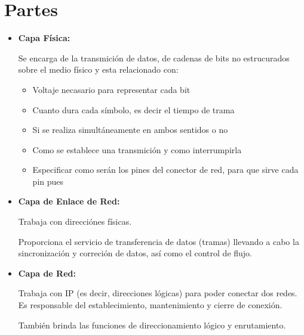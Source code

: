 \documentclass[12pt, fleqn]{report}                             %
\theoremstyle{break}                                            %
\begin{document}
        \section{Partes}

            \begin{itemize}
                
                \item \textbf{Capa Física:} 

                    Se encarga de la transmición de datos, de cadenas de bits no estrucurados sobre
                    el medio físico y esta relacionado con:
                    \begin{itemize}
                        \item Voltaje necasario para representar cada bit
                        \item Cuanto dura cada símbolo, es decir el tiempo de trama
                        \item Si se realiza simultáneamente en ambos sentidos o no
                        \item Como se establece una transmición y como interrumpirla
                        \item Especificar como serán los pines del conector de red, para que sirve
                            cada pin pues
                    \end{itemize}

                \item \textbf{Capa de Enlace de Red:} 

                    Trabaja con direcciónes físicas.

                    Proporciona el servicio de transferencia de datos (tramas) llevando a cabo
                    la sincronización y correción de datos, así como el control de flujo.

                \item \textbf{Capa de Red:}

                    Trabaja con IP (es decir, direcciones lógicas) para poder conectar dos redes. 
                    Es responsable del establecimiento, mantenimiento y cierre de conexión.

                    También brinda las funciones de direccionamiento lógico y enrutamiento.


\end{itemize}
\end{document}
